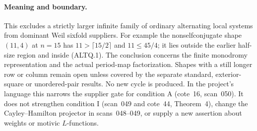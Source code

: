 \paragraph{Meaning and boundary.}
This excludes a strictly larger infinite family of ordinary
alternating local systems from dominant Weil sixfold suppliers.
For example the nonselfconjugate shape $(11,4)$ at $n=15$
has $11>\lceil15/2\rceil$ and $11\le45/4$; it lies outside
the earlier half-size region and inside (ALTQ.1).
The conclusion concerns the finite monodromy representation and
the actual period-map factorization. Shapes with a still longer
row or column remain open unless covered by the separate standard,
exterior-square or unordered-pair results. No new cycle is produced.
In the project's language this narrows the supplier gate for
condition A (cote~16, scan~050). It does not strengthen condition I
(scan~049 and cote~44, Theorem~4), change the Cayley--Hamilton
projector in scans~048--049, or supply a new assertion about
weights or motivic $L$-functions.
